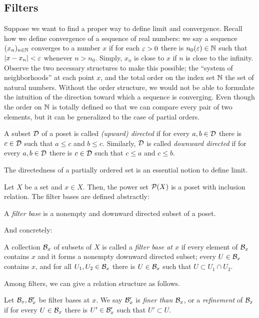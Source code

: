 \subsection{Filters}
Suppose we want to find a proper way to define limit and convergence.
Recall how we define convergence of a sequence of real numbers: we say a sequence $(x_n)_{n\in\mathbb{N}}$ converges to a number $x$ if for each $\varepsilon>0$ there is $n_0(\varepsilon)\in\mathbb{N}$ such that $|x-x_n|<\varepsilon$ whenever $n>n_0$.
Simply, $x_n$ is close to $x$ if $n$ is close to the infinity.
Observe the two necessary structures to make this possible; the ``system of neighborhoods'' at each point $x$, and the total order on the index set $\mathbb{N}$ the set of natural numbers.
Without the order structure, we would not be able to formulate the intuition of the direction toward which a sequence is converging.
Even though the order on $\mathbb{N}$ is totally defined so that we can compare every pair of two elements, but it can be generalized to the case of partial orders.
\begin{defn}
A subset $\mathcal{D}$ of a poset is called \emph{(upward) directed} if for every $a,b\in\mathcal{D}$ there is $c\in\mathcal{D}$ such that $a\le c$ and $b\le c$.
Similarly, $\mathcal{D}$ is called \emph{downward directed} if for every $a,b\in\mathcal{D}$ there is $c\in\mathcal{D}$ such that $c\le a$ and $c\le b$.
\end{defn}

The directedness of a partially ordered set is an essential notion to define limit.

Let $X$ be a set and $x\in X$.
Then, the power set $\mathcal{P}(X)$ is a poset with inclusion relation.
The filter bases are defined abstractly:
\begin{defn}
A \emph{filter base} is a nonempty and downward directed subset of a poset.
\end{defn}
And concretely:
\begin{defn}
A collection $\mathcal{B}_x$ of subsets of $X$ is called a \emph{filter base at $x$} if every element of $\mathcal{B}_x$ contains $x$ and it forms a nonempty downward directed subset; every $U\in\mathcal{B}_x$ contains $x$, and for all $U_1,U_2\in\mathcal{B}_x$ there is $U\in\mathcal{B}_x$ such that $U\subset U_1\cap U_2$.
\end{defn}

Among filters, we can give a relation structure as follows.

\begin{defn}
Let $\mathcal{B}_x,\mathcal{B}'_x$ be filter bases at $x$.
We say $\mathcal{B}'_x$ is \emph{finer than} $\mathcal{B}_x$, or a \emph{refinement} of $\mathcal{B}_x$ if for every $U\in\mathcal{B}_x$ there is $U'\in\mathcal{B}'_x$ such that $U'\subset U$.
\end{defn}

